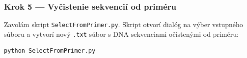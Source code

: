 \subsubsection*{Krok 5 — Vyčistenie sekvencií od priméru}
Zavolám skript \texttt{SelectFromPrimer.py}. Skript otvorí dialóg na výber vstupného súboru a vytvorí nový \texttt{.txt} súbor s DNA sekvenciami očistenými od priméru:
\begin{verbatim}
python SelectFromPrimer.py
\end{verbatim}
